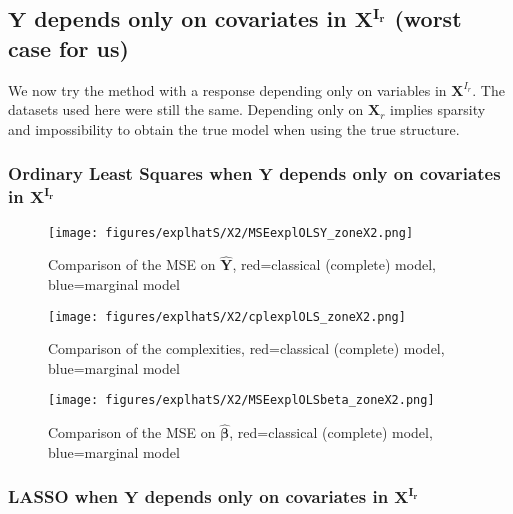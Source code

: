 \documentclass[12pt,a4paper]{report}
\begin{document}
\clearpage
	
	\subsection{$\boldsymbol{Y}$ depends only on covariates in $\boldsymbol{X^{I_r}}$ (worst case for us)}	 \label{tableMSEsimgauche}
We now try the method with a response depending only on variables in $\boldsymbol{X}^{I_r}$. The datasets used here were still the same.
Depending only on $\boldsymbol{X}_r$ implies sparsity and impossibility to obtain the true model when using the true structure. 


\FloatBarrier

\newpage
\subsubsection{Ordinary Least Squares when $\boldsymbol{Y}$ depends only on covariates in $\boldsymbol{X^{I_r}}$}

	\begin{figure}[h!]
	\centering
		  \texttt{[image: figures/explhatS/X2/MSEexplOLSY\_zoneX2.png]}
		\caption{Comparison of the MSE on $\hat{\boldsymbol{Y}}$, red=classical (complete) model, blue=marginal model}\label{MSEexplOLSY_zoneX2}
	\end{figure}
	\begin{figure}[h!]
	\centering
		  \texttt{[image: figures/explhatS/X2/cplexplOLS\_zoneX2.png]}
		\caption{Comparison of the complexities, red=classical (complete) model, blue=marginal model}\label{cplexplOLS_zoneX2}
	\end{figure}
	\begin{figure}[h!]
	\centering
		  \texttt{[image: figures/explhatS/X2/MSEexplOLSbeta\_zoneX2.png]}
		\caption{Comparison of the MSE on $\hat{\boldsymbol{\beta}}$, red=classical (complete) model, blue=marginal model}\label{MSEexplOLSbeta_zoneX2}
	\end{figure}
	\FloatBarrier
\newpage
\subsubsection{LASSO when $\boldsymbol{Y}$ depends only on covariates in $\boldsymbol{X^{I_r}}$}
\end{document}
